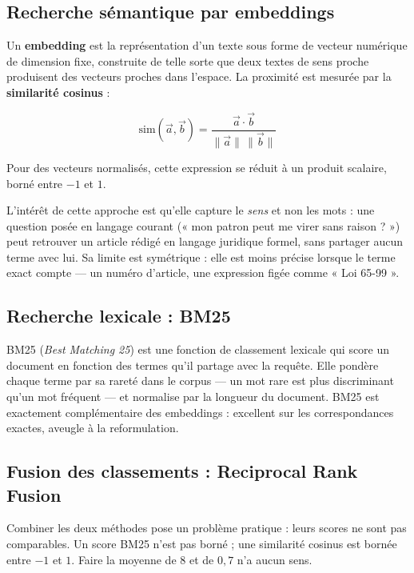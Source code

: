 \subsection{Recherche sémantique par embeddings}

Un \textbf{embedding} est la représentation d'un texte sous forme de vecteur numérique de
dimension fixe, construite de telle sorte que deux textes de sens proche produisent des vecteurs
proches dans l'espace. La proximité est mesurée par la \textbf{similarité cosinus} :

\begin{equation}
    \mathrm{sim}(\vec{a}, \vec{b}) = \frac{\vec{a} \cdot \vec{b}}{\|\vec{a}\|\,\|\vec{b}\|}
\end{equation}

Pour des vecteurs normalisés, cette expression se réduit à un produit scalaire, borné entre $-1$
et $1$.

L'intérêt de cette approche est qu'elle capture le \emph{sens} et non les mots : une question
posée en langage courant (« mon patron peut me virer sans raison ? ») peut retrouver un article
rédigé en langage juridique formel, sans partager aucun terme avec lui. Sa limite est
symétrique : elle est moins précise lorsque le terme exact compte --- un numéro d'article, une
expression figée comme « Loi 65-99 ».

\subsection{Recherche lexicale : BM25}

BM25 (\textit{Best Matching 25}) est une fonction de classement lexicale qui score un document en
fonction des termes qu'il partage avec la requête. Elle pondère chaque terme par sa rareté dans
le corpus --- un mot rare est plus discriminant qu'un mot fréquent --- et normalise par la
longueur du document. BM25 est exactement complémentaire des embeddings : excellent sur les
correspondances exactes, aveugle à la reformulation.

\subsection{Fusion des classements : Reciprocal Rank Fusion}

Combiner les deux méthodes pose un problème pratique : leurs scores ne sont pas comparables. Un
score BM25 n'est pas borné ; une similarité cosinus est bornée entre $-1$ et $1$. Faire la
moyenne de $8$ et de $0{,}7$ n'a aucun sens.

